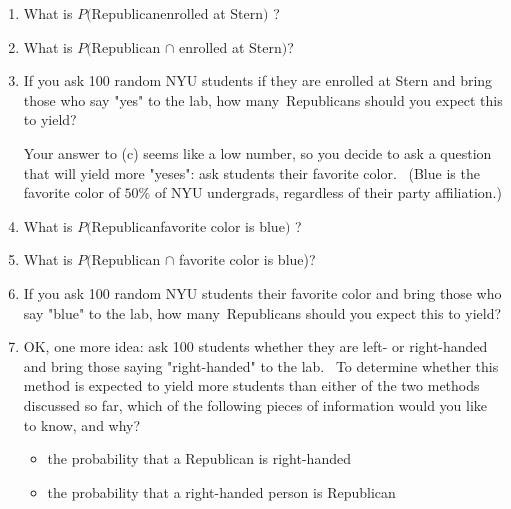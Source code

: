 \documentclass[11pt]{article}
\begin{document}
\begin{enumerate}
\begin{enumerate}
\item What is $P($Republican\TEXTsymbol{\vert}enrolled at Stern$)$ ?\bigskip 

\item What is $P($Republican $\cap $ enrolled at Stern$)$?\bigskip 

\item If you ask 100 random NYU students if they are enrolled at Stern and
bring those who say "yes" to the lab, how many\ Republicans should you
expect this to yield?\bigskip \bigskip 

Your answer to (c) seems like a low number, so you decide to ask a question
that will yield more "yeses": ask students their favorite color. \ (Blue is
the favorite color of $50\%$ of NYU undergrads, regardless of their party
affiliation.)\bigskip 

\item What is $P($Republican\TEXTsymbol{\vert}favorite color is blue$)$
?\bigskip 

\item What is $P($Republican $\cap $ favorite color is blue)?\bigskip 

\item If you ask 100 random NYU students their favorite color and bring
those who say "blue" to the lab, how many\ Republicans should you expect
this to yield?\bigskip 

\item OK, one more idea: ask 100 students whether they are left- or
right-handed and bring those saying "right-handed" to the lab. \ To
determine whether this method is expected to yield more students than either
of the two methods discussed so far, which of the following pieces of
information would you like to know, and why?

\begin{itemize}
\item the probability that a Republican is right-handed

\item the probability that a right-handed person is Republican
\end{itemize}
\end{enumerate}
\end{enumerate}
\end{document}
